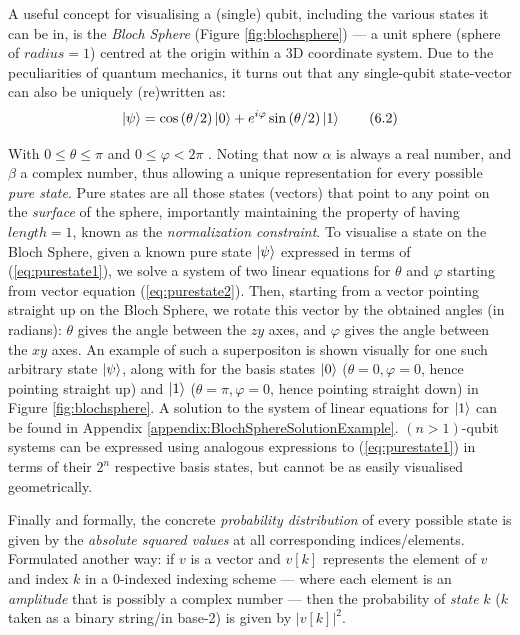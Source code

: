 \documentclass[conference]{IEEEtran}
\begin{document}
A useful concept for visualising a (single) qubit, including the various states it can be in,
is the \textit{Bloch Sphere} (Figure \ref{fig:blochsphere})
— a unit sphere (sphere of $radius=1$) centred at the origin within a 3D coordinate system.
Due to the peculiarities of quantum mechanics,
it turns out that any single-qubit state-vector can also be uniquely (re)written as:
\begin{equation}
    \ket{\psi} = \cos{(\theta/2)}\ket{0} + e^{i\varphi}\sin{(\theta/2)}\ket{1} \tag{6.2} \label{eq:purestate2}
\end{equation}

With $0\le \theta \le \pi$ and $0 \le \varphi < 2 \pi$ \cite{ref:nmrquantuminformationprocessing}.
Noting that now $\alpha$ is always a real number, and $\beta$ a complex number, thus allowing a unique representation
for every possible \textit{pure state}.
Pure states are all those states (vectors) that point to any point on the \textit{surface}
of the sphere, importantly maintaining the property of having $length=1$, known as the \textit{normalization constraint}.
To visualise a state on the Bloch Sphere, given a known pure state $\ket{\psi}$ expressed in terms of (\ref{eq:purestate1}),
we solve a system of two linear equations for $\theta$ and $\varphi$ starting from vector equation (\ref{eq:purestate2}).
Then, starting from a vector pointing straight up on the Bloch Sphere, we rotate this vector
by the obtained angles (in radians): $\theta$ gives the angle between the $zy$ axes, and $\varphi$ gives the angle between the $xy$ axes.
An example of such a superpositon is shown visually for one such arbitrary state $\ket{\psi}$,
along with for the basis states $\ket{0}$ ($\theta=0,\varphi=0$, hence pointing straight up)
and $\ket{1}$ ($\theta=\pi,\varphi=0$, hence pointing straight down) in Figure \ref{fig:blochsphere}.
A solution to the system of linear equations for $\ket{1}$ can be found in Appendix \ref{appendix:BlochSphereSolutionExample}.
$(n>1)$-qubit systems can be expressed using analogous expressions to (\ref{eq:purestate1}) in terms of their $2^n$ respective basis states,
but cannot be as easily visualised geometrically.

Finally and formally, the concrete \textit{probability distribution} of every possible state is
given by the \textit{absolute squared values} at all corresponding indices/elements. Formulated another way:
if $v$ is a vector and $v[k]$ represents the element
of $v$ and index $k$ in a 0-indexed indexing scheme
— where each element is an \textit{amplitude} that is possibly a complex number —
then the probability of \textit{state} $k$ ($k$ taken as a binary string/in base-2) is given by $|v[k]|^2$.
\end{document}
